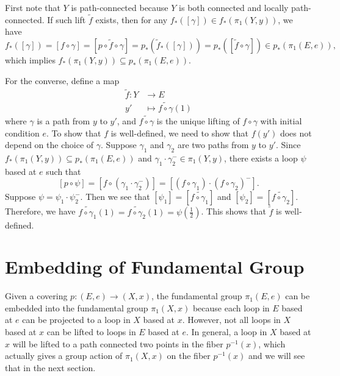 \documentclass{report}
\begin{document}
\begin{prf} 
	First note that $Y$ is path-connected because $Y$ is both connected and locally path-connected. If such lift $\widetilde{f}$ exists, then for any $f_*([\gamma])\in f_*\left(\pi_1\left(Y, y\right)\right)$, we have $$f_*([\gamma])=[f\circ\gamma]=[p\circ\widetilde{f}\circ\gamma]=p_*\left(\widetilde{f}_*([\gamma])\right)=p_*\left(\left[\widetilde{f}\circ\gamma\right]\right)\in p_*\left(\pi_1(E,e)\right),$$
	which implies $f_*\left(\pi_1\left(Y, y\right)\right) \subseteq p_*\left(\pi_1\left(E, e\right)\right)$.

	For the converse, define a map
	\begin{align*}
		\widetilde{f}:Y&\longrightarrow E\\
		y'&\longmapsto \widetilde{f\circ \gamma}(1)
	\end{align*}
	where $\gamma$ is a path from $y$ to $y'$, and $\widetilde{f\circ \gamma}$ is the unique lifting of $f\circ \gamma$ with initial condition $e$. To show that $f$ is well-defined, we need to show that $f(y')$ does not depend on the choice of $\gamma$. Suppose $\gamma_1$ and $\gamma_2$ are two paths from $y$ to $y'$. Since $f_*\left(\pi_1\left(Y, y\right)\right) \subseteq p_*\left(\pi_1\left(E, e\right)\right)$ and $\gamma_1\cdot \gamma_2^{-}\in \pi_1\left(Y, y\right)$, there exists a loop $\psi$ based at $e$ such that
	\[
		[p\circ\psi]=\left[f\circ\left(\gamma_1\cdot \gamma_2^{-}\right)\right]=\left[\left(f\circ\gamma_1\right)\cdot\left(f\circ\gamma_2\right)^{-}\right].	
	\]
	Suppose $\psi=\psi_1\cdot\psi_2^{-}$. Then we see that $\left[\psi_1\right]=\left[\widetilde{f\circ\gamma_1}\right]$ and $\left[\psi_2\right]=\left[\widetilde{f\circ\gamma_2}\right]$. Therefore, we have $\widetilde{f\circ\gamma_1}(1)=\widetilde{f\circ\gamma_2}(1)=\psi\left(\frac{1}{2}\right)$. This shows that $\widetilde{f}$ is well-defined.
\end{prf}


\section{Embedding of Fundamental Group}
Given a covering $p:(E,e)\to (X,x)$, the fundamental group $\pi_1(E,e)$ can be embedded into the fundamental group $\pi_1(X,x)$ because each loop in $E$ based at $e$ can be projected to a loop in $X$ based at $x$. However, not all loops in $X$ based at $x$ can be lifted to loops in $E$ based at $e$. In general, a loop in $X$ based at $x$ will be lifted to a path connected two points in the fiber $p^{-1}(x)$, which actually gives a group action of $\pi_1(X,x)$ on the fiber $p^{-1}(x)$ and we will see that in the next section.
\end{document}
